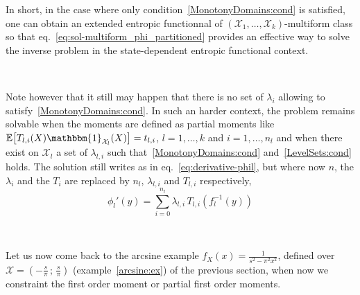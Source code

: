 \documentclass[entropy,article,submit,moreauthors,pdftex]{Definitions/mdpi}
\newcounter{arcsineExample}%
\newcommand{\SZ}[1]{{\color{blue} #1}}                                       %
\def\X{\mathcal{X}}%
\def\un{\mathbbm{1}}%
\newcommand{\Esp}[1]{\mathbb{E}\left[ #1 \right]}%
\begin{document}
In  short,  in  the  case  where  only  condition~\ref{MonotonyDomains:cond}  is
satisfied,   one    can   obtain    an   extended   entropic    functionnal   of
$(\X_1,\ldots,\X_k)$-multiform             class             so             that
eq.~\eqref{eq:sol-multiform_phi_partitioned} provides an  effective way to solve
the inverse problem in the state-dependent entropic functional context.

\

Note  however that  it still  may happen  that there  is no  set of  $\lambda_i$
allowing to satisfy~\ref{MonotonyDomains:cond}.  In  such an harder context, the
problem remains  solvable when the moments  are defined as partial  moments like
$\Esp{T_{l,i}(X) \un_{\X_l}(X)} =  t_{l,i}$, $l = 1 ,  \ldots , k$ and $i  = 1 ,
\ldots ,  n_l$ and  when there  exist on  $\X_l$ a  set of  $\lambda_{l,i}$ such
that~\ref{MonotonyDomains:cond}  and~\ref{LevelSets:cond}  holds.  The  solution
still  writes  as in  eq.~\eqref{eq:derivative-phil},  but  where now  $n$,  the
$\lambda_i$ and the  $T_i$ are replaced by $n_l$,  $\lambda_{l,i}$ and $T_{l,i}$
respectively,
%
\SZ{
\begin{equation}\label{eq:derivative-phil-partial}
\phi_l'(y) = \sum_{i=0}^{n_l} \lambda_{l,i} \, T_{l,i} \left(f_l^{-1}(y)\right)
\end{equation}
}

\

Let us now come  back to the arcsine example \SZ{$f_X(x)  = \frac{1}{s^2 - \pi^2
    x^2}$,  defined over  $\X =  \left( -  \frac{s}{\pi} \,  ; \,  \frac{s}{\pi}
  \right)$}  (example~\ref{arcsine:ex}) of  the  previous section,  when now  we
constraint the first order moment or partial first order moments.

\setcounter{example}{0}
\renewcommand{\theexample}{\thearcsineExample-\arabic{example}}
\end{document}
